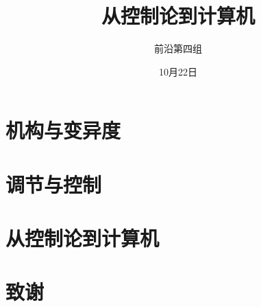 \documentclass[12pt,AutoFakeBold,aspectratio=43,mathserif]{beamer}
\title{从控制论到计算机}
\author{前沿第四组}
\date{10月22日}
\begin{document}
    \begin{frame}
        \titlepage
    
    \end{frame}
    
    \section{机构与变异度}

    \section{调节与控制}

    \section{从控制论到计算机}

    \section*{致谢}
\end{document}
